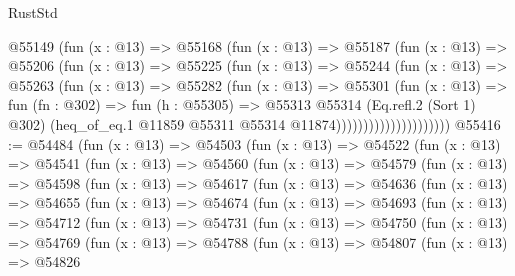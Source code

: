 \begin{lexlean}{RustStd}
\begin{coremodule}
                        @55149
                          (fun (x : @13) =>
                          @55168
                            (fun (x : @13) =>
                            @55187
                              (fun (x : @13) =>
                              @55206
                                (fun (x : @13) =>
                                @55225
                                  (fun (x : @13) =>
                                  @55244
                                    (fun (x : @13) =>
                                    @55263
                                      (fun (x : @13) =>
                                      @55282
                                        (fun (x : @13) =>
                                        @55301
                                          (fun (x : @13) =>
                                          fun (fn : @302) =>
                                          fun (h : @55305) =>
                                          @55313
                                            @55314
                                            (Eq.refl.{2} (Sort 1) @302)
                                            (heq_of_eq.{1}
                                              @11859
                                              @55311
                                              @55314
                                              @11874)))))))))))))))))))))
@55416 := @54484
    (fun (x : @13) =>
    @54503
      (fun (x : @13) =>
      @54522
        (fun (x : @13) =>
        @54541
          (fun (x : @13) =>
          @54560
            (fun (x : @13) =>
            @54579
              (fun (x : @13) =>
              @54598
                (fun (x : @13) =>
                @54617
                  (fun (x : @13) =>
                  @54636
                    (fun (x : @13) =>
                    @54655
                      (fun (x : @13) =>
                      @54674
                        (fun (x : @13) =>
                        @54693
                          (fun (x : @13) =>
                          @54712
                            (fun (x : @13) =>
                            @54731
                              (fun (x : @13) =>
                              @54750
                                (fun (x : @13) =>
                                @54769
                                  (fun (x : @13) =>
                                  @54788
                                    (fun (x : @13) =>
                                    @54807
                                      (fun (x : @13) =>
                                      @54826

\end{coremodule}
\end{lexlean}
